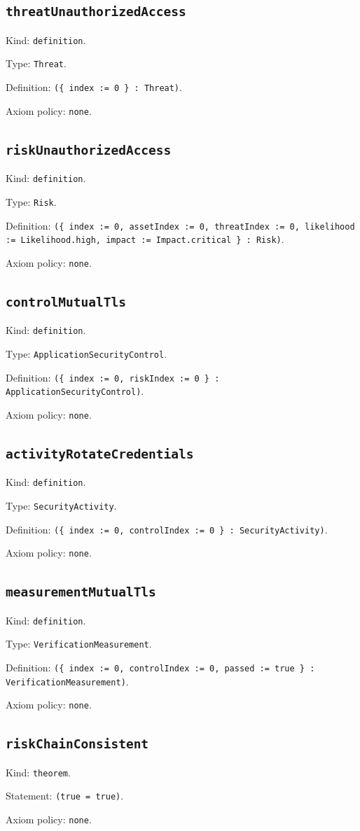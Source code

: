 \documentclass[11pt]{article}
\begin{document}
\subsection*{\texttt{threatUnauthorizedAccess}}
\noindent Kind: \texttt{definition}.\par
\noindent Type: \texttt{Threat}.\par
\noindent Definition: \texttt{(\{ index := 0 \} : Threat)}.\par
\noindent Axiom policy: \texttt{none}.\par
\subsection*{\texttt{riskUnauthorizedAccess}}
\noindent Kind: \texttt{definition}.\par
\noindent Type: \texttt{Risk}.\par
\noindent Definition: \texttt{(\{ index := 0, assetIndex := 0, threatIndex := 0, likelihood := Likelihood.high, impact := Impact.critical \} : Risk)}.\par
\noindent Axiom policy: \texttt{none}.\par
\subsection*{\texttt{controlMutualTls}}
\noindent Kind: \texttt{definition}.\par
\noindent Type: \texttt{ApplicationSecurityControl}.\par
\noindent Definition: \texttt{(\{ index := 0, riskIndex := 0 \} : ApplicationSecurityControl)}.\par
\noindent Axiom policy: \texttt{none}.\par
\subsection*{\texttt{activityRotateCredentials}}
\noindent Kind: \texttt{definition}.\par
\noindent Type: \texttt{SecurityActivity}.\par
\noindent Definition: \texttt{(\{ index := 0, controlIndex := 0 \} : SecurityActivity)}.\par
\noindent Axiom policy: \texttt{none}.\par
\subsection*{\texttt{measurementMutualTls}}
\noindent Kind: \texttt{definition}.\par
\noindent Type: \texttt{VerificationMeasurement}.\par
\noindent Definition: \texttt{(\{ index := 0, controlIndex := 0, passed := true \} : VerificationMeasurement)}.\par
\noindent Axiom policy: \texttt{none}.\par
\subsection*{\texttt{riskChainConsistent}}
\noindent Kind: \texttt{theorem}.\par
\noindent Statement: \texttt{(true = true)}.\par
\noindent Axiom policy: \texttt{none}.\par
\end{document}
